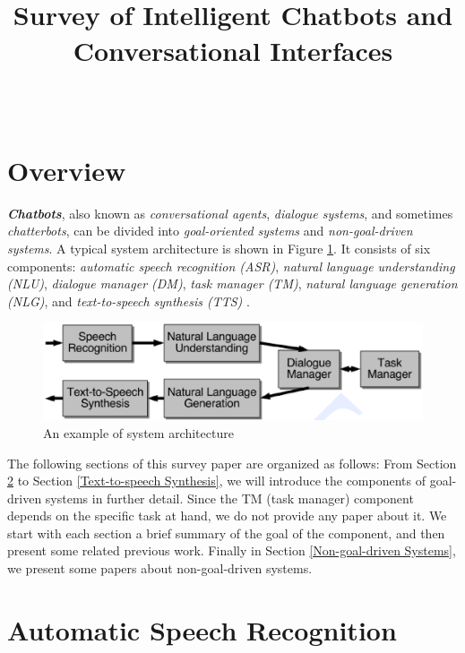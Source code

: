 \documentclass[paper=a4, fontsize=18pt]{article} %
\title{	
\normalfont \normalsize
\horrule{0.5pt} \\[0.4cm] %
\huge Survey of Intelligent Chatbots and Conversational Interfaces \\ %
\horrule{2pt} \\[0.5cm] %
}
\author{}
\numberwithin{equation}{section} %
\numberwithin{figure}{section} %
\numberwithin{table}{section} %
\begin{document}
\maketitle
\tableofcontents

\section{Overview}

\textbf{\emph{Chatbots}}, also known as \emph{conversational agents}, \emph{dialogue systems}, and sometimes \emph{chatterbots}, can be divided into \emph{goal-oriented systems} and \emph{non-goal-driven systems}. A typical system architecture is shown in Figure \ref{system architecture}. It consists of six components: \emph{automatic speech recognition (ASR)}, \emph{natural language understanding (NLU)}, \emph{dialogue manager (DM)}, \emph{task manager (TM)}, \emph{natural language generation (NLG)}, and \emph{text-to-speech synthesis (TTS)} \cite{Jurafsky2006}.

\begin{figure}[htbp]
  \centering
  \includegraphics[width=\linewidth]{system_architecture}
  \caption{An example of system architecture}
	\label{system architecture}
\end{figure}

The following sections of this survey paper are organized as follows: From Section \ref{Automatic Speech Recognition} to Section \ref{Text-to-speech Synthesis}, we will introduce the components of goal-driven systems in further detail. Since the TM (task manager) component depends on the specific task at hand, we do not provide any paper about it. We start with each section a brief summary of the goal of the component, and then present some related previous work. Finally in Section \ref{Non-goal-driven Systems}, we present some papers about non-goal-driven systems.

\section{Automatic Speech Recognition} \label{Automatic Speech Recognition}
\end{document}
